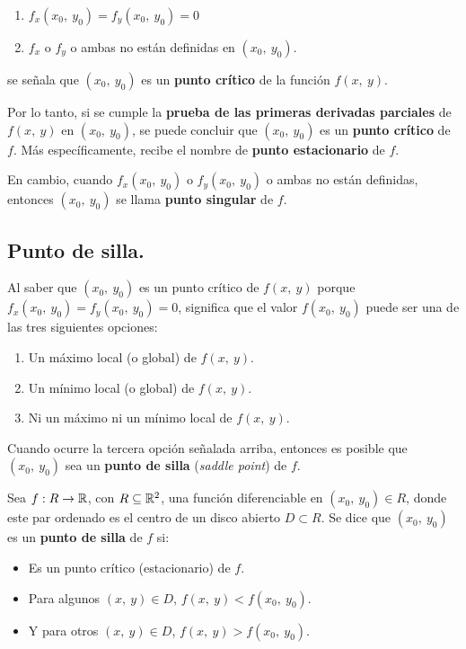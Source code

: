 \documentclass[12pt]{article}
\begin{document}
\begin{enumerate}
\item $f_{x}(x_{0}, \ y_{0}) = f_{y}(x_{0}, \ y_{0}) = 0$ 
\item $f_{x}$ o $f_{y}$ o ambas no están definidas en $(x_{0}, \ y_{0})$.
\end{enumerate}

se señala que $(x_{0}, \ y_{0})$ es un \textbf{punto crítico} de la función $f(x, \ y)$.

Por lo tanto, si se cumple la \textbf{prueba de las primeras derivadas parciales} de $f(x, \ y)$ en $(x_{0}, \ y_{0})$, se puede concluir que $(x_{0}, \ y_{0})$ es un \textbf{punto crítico} de $f$. Más específicamente, recibe el nombre de \textbf{punto estacionario} de $f$.

En cambio, cuando $f_{x}(x_{0}, \ y_{0})$ o $f_{y}(x_{0}, \ y_{0})$ o ambas no están definidas, entonces $(x_{0}, \ y_{0})$ se llama \textbf{punto singular} de $f$.

\subsection{Punto de silla.}

Al saber que $(x_{0}, \ y_{0})$ es un punto crítico de $f(x, \ y)$ porque $f_{x}(x_{0}, \ y_{0}) = f_{y}(x_{0}, \ y_{0}) = 0$, significa que el valor $f(x_{0}, \ y_{0})$ puede ser una de las tres siguientes opciones:

\begin{enumerate}
\item Un máximo local (o global) de $f(x, \ y)$.
\item Un mínimo local (o global) de $f(x, \ y)$.
\item Ni un máximo ni un mínimo local de $f(x, \ y)$.
\end{enumerate}

Cuando ocurre la tercera opción señalada arriba, entonces es posible que $(x_{0}, \ y_{0})$ sea un \textbf{punto de silla} (\textit{saddle point}) de $f$.

Sea $f:R \to \mathbb{R}$, con $R \subseteq \mathbb{R}^{2}$, una función diferenciable en $(x_{0}, \ y_{0}) \in R$, donde este par ordenado es el centro de un disco abierto $D \subset R$. Se dice que $(x_{0}, \ y_{0})$ es un \textbf{punto de silla} de $f$ si:

\begin{itemize}
\item Es un punto crítico (estacionario) de $f$.
\item Para algunos $(x, \ y) \in D$, $f(x, \ y) < f(x_{0}, \ y_{0})$.
\item Y para otros $(x, \ y) \in D$, $f(x, \ y) > f(x_{0}, \ y_{0})$.
\end{itemize}
\end{document}
